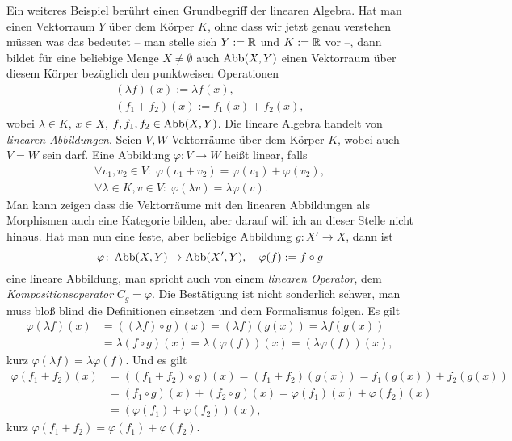 Ein weiteres Beispiel berührt einen Grundbegriff der linearen Algebra.
Hat man einen Vektorraum $Y$ über dem Körper $K$, ohne dass wir jetzt
genau verstehen müssen was das bedeutet -- man stelle sich $Y:=\mathbb R$
und $K:=\mathbb R$ vor --, dann bildet für eine beliebige Menge $X\ne\emptyset$
auch $\operatorname{Abb}(X,Y)$ einen Vektorraum über diesem Körper bezüglich den
punktweisen Operationen%
\begin{gather}
(\lambda f)(x) := \lambda f(x),\\
(f_1+f_2)(x) := f_1(x)+f_2(x),
\end{gather} 
wobei $\lambda\in K$, $x\in X$, $f,f_1,f_2\in\operatorname{Abb}(X,Y)$. Die lineare
Algebra handelt von \emph{linearen Abbildungen}. Seien $V,W$
Vektorräume über dem Körper $K$, wobei auch $V=W$ sein darf. Eine
Abbildung $\varphi\colon V\to W$ heißt linear, falls%
\begin{gather}
\forall v_1,v_2\in V\colon\;\varphi(v_1+v_2) = \varphi(v_1)+\varphi(v_2),\\
\forall \lambda\in K,v\in V\colon\;\varphi(\lambda v) = \lambda\varphi(v).
\end{gather}
Man kann zeigen dass die Vektorräume mit den linearen Abbildungen
als Morphismen auch eine Kategorie bilden, aber darauf will ich an
dieser Stelle nicht hinaus. Hat man nun eine feste, aber beliebige
Abbildung $g\colon X'\to X$, dann ist%
\begin{equation}
\varphi\colon\operatorname{Abb}(X,Y)\to\operatorname{Abb}(X',Y),\quad \varphi(f):=f\circ g
\end{equation}
eine lineare Abbildung, man spricht auch von einem
\emph{linearen Operator}, dem \emph{Kompositionsoperator}
$C_g=\varphi$. Die Bestätigung ist nicht sonderlich schwer, man
muss bloß blind die Definitionen einsetzen und dem Formalismus
folgen. Es gilt%
\begin{align}
\varphi(\lambda f)(x) &= ((\lambda f)\circ g)(x)
= (\lambda f)(g(x)) = \lambda f(g(x))\\
&= \lambda (f\circ g)(x) = \lambda (\varphi(f))(x)
= (\lambda\varphi(f))(x),
\end{align}
kurz $\varphi(\lambda f)=\lambda\varphi(f)$. Und es gilt
\begin{align}
\varphi(f_1+f_2)(x) &= ((f_1+f_2)\circ g)(x)
= (f_1+f_2)(g(x)) = f_1(g(x)) + f_2(g(x))\\
&= (f_1\circ g)(x) + (f_2\circ g)(x)
= \varphi(f_1)(x)+\varphi(f_2)(x)\\
&= (\varphi(f_1)+\varphi(f_2))(x),
\end{align}
kurz $\varphi(f_1+f_2)=\varphi(f_1)+\varphi(f_2)$.


